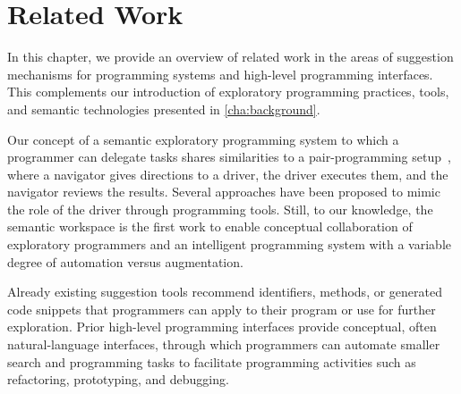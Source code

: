 
\chapter{Related Work}
\label{cha:related_work}

In this chapter, we provide an overview of related work in the areas of suggestion mechanisms for programming systems and high-level programming interfaces.
This complements our introduction of exploratory programming practices, tools, and semantic technologies presented in \cref{cha:background}.

Our concept of a semantic exploratory programming system to which a programmer can delegate tasks shares similarities to a pair-programming setup~\cite{beck2000extreme}, where a navigator gives directions to a driver, the driver executes them, and the navigator reviews the results.
Several approaches have been proposed to mimic the role of the driver through programming tools.
Still, to our knowledge, the semantic workspace is the first work to enable conceptual collaboration of exploratory programmers and an intelligent programming system with a variable degree of automation versus augmentation.


\begin{summary}
	Already existing suggestion tools recommend identifiers, methods, or generated code snippets that programmers can apply to their program or use for further exploration.
	Prior high-level programming interfaces provide conceptual, often natural-language interfaces, through which programmers can automate smaller search and programming tasks to facilitate programming activities such as refactoring, prototyping, and debugging.
\end{summary}
